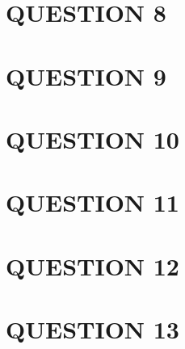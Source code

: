 \documentclass[a4paper]{article}
\begin{document}
\section{QUESTION 8}
\section{QUESTION 9}
\section{QUESTION 10}
\section{QUESTION 11}
\section{QUESTION 12}
\section{QUESTION 13}
\end{document}

